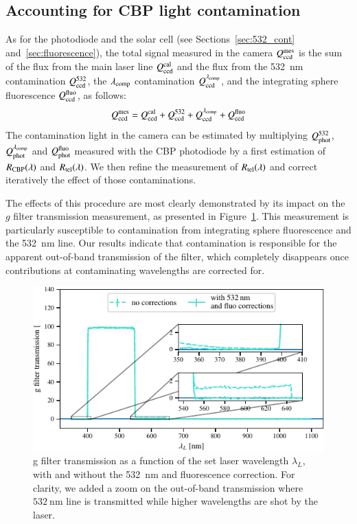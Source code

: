 \subsection{Accounting for CBP light contamination}\label{sec:sd_contaminations}

As for the photodiode and the solar cell (see Sections~\ref{sec:532_cont} and~\ref{sec:fluorescence}), the total signal measured in the \SD camera $Q_{\mathrm{ccd}}^{\mathrm{mes}}$ is the sum of the flux from the main laser line $Q_{\mathrm{ccd}}^{\mathrm{cal}}$ and the flux from the \SI{532}{\nm} contamination $Q_{\mathrm{ccd}}^{532}$, the $\lambda_{\rm comp}$ contamination $Q_{\mathrm{ccd}}^{\lambda_{\rm comp}}$, and the integrating sphere fluorescence $Q_{\mathrm{ccd}}^{\mathrm{fluo}}$, as follows:
\begin{equation}
    Q_{\mathrm{ccd}}^{\mathrm{mes}} = Q_{\mathrm{ccd}}^{\mathrm{cal}} + Q_{\mathrm{ccd}}^{532} + Q_{\mathrm{ccd}}^{\lambda_{\rm comp}} + Q_{\mathrm{ccd}}^{\mathrm{fluo}}
    \label{eq:qccd_mes}
\end{equation}
The contamination light in the \SD camera can be estimated by multiplying $Q_{\mathrm{phot}}^{532}$, $Q_{\mathrm{phot}}^{\lambda_{\rm comp}}$ and $Q_{\mathrm{phot}}^{\mathrm{fluo}}$ measured with the CBP photodiode by a first estimation of $R_{\mathrm{CBP}}(\lambda)$ and $R_{\mathrm{tel}}(\lambda)$. We then refine the measurement of $R_{\mathrm{tel}}(\lambda)$ and correct iteratively the effect of those contaminations.

The effects of this procedure are most clearly demonstrated by its impact on the \SD $g$ filter transmission measurement, as presented in Figure~\ref{fig:g_filter_532}. This measurement is particularly susceptible to contamination from integrating sphere fluorescence and the \SI{532}{\nano\meter} line. Our results indicate that contamination is responsible for the apparent out-of-band transmission of the filter, which completely disappears once contributions at contaminating wavelengths are corrected for.

\begin{figure}[h]
    \centering
    \includegraphics[width=\columnwidth]{fig/g_filter_532.pdf}
    \caption{\SD g filter transmission as a function of the set laser wavelength $\lambda_L$, with and without the \SI{532}{\nm} and fluorescence correction. For clarity, we added a zoom on the out-of-band transmission where $\SI{532}{\nm}$ line is transmitted while higher wavelengths are shot by the laser.}
    \label{fig:g_filter_532}
\end{figure}



